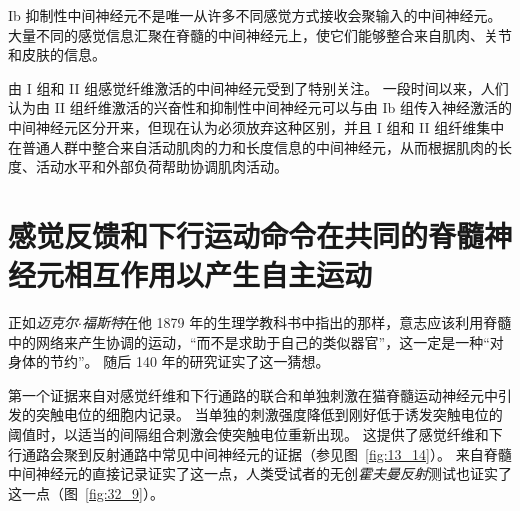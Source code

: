 Ib 抑制性中间神经元不是唯一从许多不同感觉方式接收会聚输入的中间神经元。
大量不同的感觉信息汇聚在脊髓的中间神经元上，使它们能够整合来自肌肉、关节和皮肤的信息。


由 I 组和 II 组感觉纤维激活的中间神经元受到了特别关注。
一段时间以来，人们认为由 II 组纤维激活的兴奋性和抑制性中间神经元可以与由 Ib 组传入神经激活的中间神经元区分开来，但现在认为必须放弃这种区别，并且 I 组和 II 组纤维集中在普通人群中整合来自活动肌肉的力和长度信息的中间神经元，从而根据肌肉的长度、活动水平和外部负荷帮助协调肌肉活动。



\section{感觉反馈和下行运动命令在共同的脊髓神经元相互作用以产生自主运动}

正如\textit{迈克尔$\cdot$福斯特}在他 1879 年的生理学教科书中指出的那样，意志应该利用脊髓中的网络来产生协调的运动，“而不是求助于自己的类似器官”，这一定是一种“对身体的节约”。
随后 140 年的研究证实了这一猜想。


第一个证据来自对感觉纤维和下行通路的联合和单独刺激在猫脊髓运动神经元中引发的突触电位的细胞内记录。
当单独的刺激强度降低到刚好低于诱发突触电位的阈值时，以适当的间隔组合刺激会使突触电位重新出现。
这提供了感觉纤维和下行通路会聚到反射通路中常见中间神经元的证据（参见图~\ref{fig:13_14}）。
来自脊髓中间神经元的直接记录证实了这一点，人类受试者的无创\textit{霍夫曼反射}测试也证实了这一点（图~\ref{fig:32_9}）。


